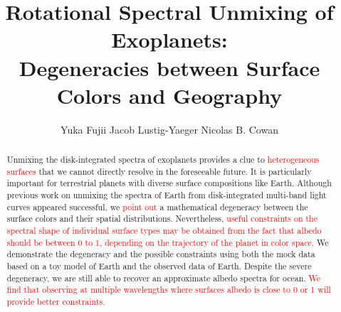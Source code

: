 \documentclass[iop,numberedappendix,apj]{emulateapj}
\def\edit#1{\textcolor{red}{#1}}
\begin{document}
\title{Rotational Spectral Unmixing of Exoplanets:\\Degeneracies between Surface Colors and Geography}


\author{
%
Yuka Fujii 
%
Jacob Lustig-Yaeger 
%
Nicolas B. Cowan 
%
}

      
  







\vspace{0.5\baselineskip}


\begin{abstract}

Unmixing the disk-integrated spectra of exoplanets provides a clue to \edit{heterogeneous surfaces} that we cannot directly resolve in the foreseeable future. 
It is particularly important for terrestrial planets with diverse surface compositions like Earth. 
Although previous work on unmixing the spectra of Earth from disk-integrated multi-band light curves appeared successful, we \edit{point out} a mathematical degeneracy between the surface colors and their spatial  distributions. 
Nevertheless, \edit{useful constraints on the spectral shape of individual surface types may be obtained from the fact that albedo should be between 0 to 1, depending on the trajectory of the planet in color space}.  
We demonstrate the degeneracy and the possible constraints using both the mock data based on a toy model of Earth and the observed data of Earth. 
Despite the severe degeneracy, we are still able to recover an approximate albedo spectra for ocean. 
\edit{We find that observing at multiple wavelengths where surfaces albedo is close to 0 or 1 will provide better constraints. }

\end{abstract}
\end{document}
